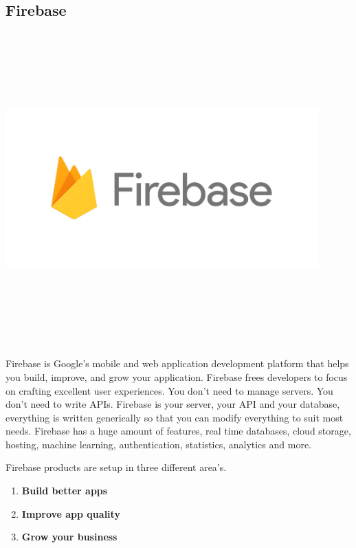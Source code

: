 \newpage

\subsection{Firebase}
\par
\medskip
\begin{center}
    \includegraphics[width=12cm,height=12cm,keepaspectratio]{Images/firebase.png}
\end{center}

Firebase is Google's mobile and web application development platform that helps you build, improve, and grow your application. Firebase frees developers to focus on crafting excellent user experiences. You don't need to manage servers. You don't need to write APIs. Firebase is your server, your API and your database, everything is written generically so that you can modify everything to suit most needs. Firebase has a huge amount of features, real time databases, cloud storage, hosting, machine learning, authentication, statistics, analytics and more.\newline

Firebase products are setup in three different area's.
\begin{enumerate}
  \item \textbf{Build better apps}
  \item \textbf{Improve app quality}
  \item \textbf{Grow your business}
\end{enumerate}

